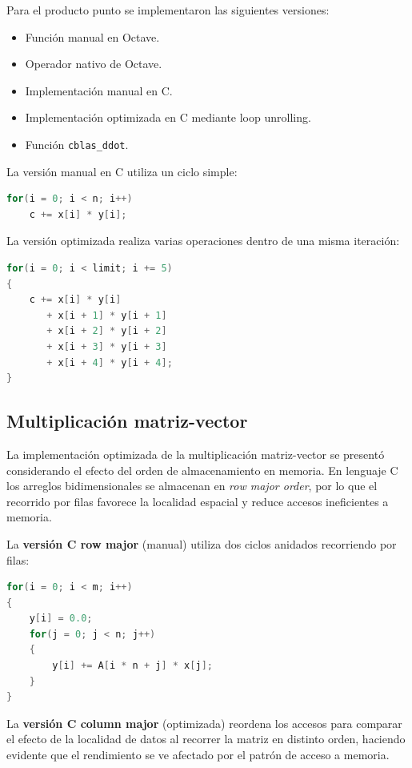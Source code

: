 \documentclass[12pt,letterpaper]{article}
\begin{document}
Para el producto punto se implementaron las siguientes versiones:

\begin{itemize}
    \item Función manual en Octave.
    \item Operador nativo de Octave.
    \item Implementación manual en C.
    \item Implementación optimizada en C mediante loop unrolling.
    \item Función \texttt{cblas\_ddot}.
\end{itemize}

La versión manual en C utiliza un ciclo simple:

\begin{lstlisting}[language=C]
for(i = 0; i < n; i++)
    c += x[i] * y[i];
\end{lstlisting}

La versión optimizada realiza varias operaciones dentro de una misma iteración:

\begin{lstlisting}[language=C]
for(i = 0; i < limit; i += 5)
{
    c += x[i] * y[i]
       + x[i + 1] * y[i + 1]
       + x[i + 2] * y[i + 2]
       + x[i + 3] * y[i + 3]
       + x[i + 4] * y[i + 4];
}
\end{lstlisting}

\subsection{Multiplicación matriz-vector}

La implementación optimizada de la multiplicación matriz-vector se presentó considerando el efecto del orden de almacenamiento en memoria. En lenguaje C los arreglos bidimensionales se almacenan en \textit{row major order}, por lo que el recorrido por filas favorece la localidad espacial y reduce accesos ineficientes a memoria.

La \textbf{versión C row major} (manual) utiliza dos ciclos anidados recorriendo por filas:

\begin{lstlisting}[language=C]
for(i = 0; i < m; i++)
{
    y[i] = 0.0;
    for(j = 0; j < n; j++)
    {
        y[i] += A[i * n + j] * x[j];
    }
}
\end{lstlisting}

La \textbf{versión C column major} (optimizada) reordena los accesos para comparar el efecto de la localidad de datos al recorrer la matriz en distinto orden, haciendo evidente que el rendimiento se ve afectado por el patrón de acceso a memoria.
\end{document}
